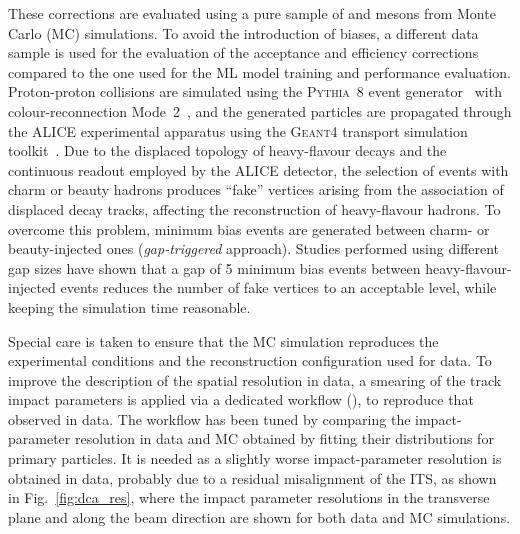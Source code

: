 These corrections are evaluated using a pure sample of \ds and \dpl mesons from Monte Carlo (MC) simulations. To avoid the introduction of biases, a different data sample is used for the evaluation of the acceptance and efficiency corrections compared to the one used for the ML model training and performance evaluation. Proton-proton collisions are simulated using the \textsc{Pythia~8} event generator~\cite{Bierlich:2022pfr} with colour-reconnection Mode~2~\cite{Christiansen:2015yqa}, and the generated particles are propagated through the ALICE experimental apparatus using the \textsc{Geant4} transport simulation toolkit~\cite{GEANT4:2002zbu}. Due to the displaced topology of heavy-flavour decays and the continuous readout employed by the ALICE detector, the selection of events with charm or beauty hadrons produces ``fake'' vertices arising from the association of displaced decay tracks, affecting the reconstruction of heavy-flavour hadrons. To overcome this problem, minimum bias events are generated between charm- or beauty-injected ones (\emph{gap-triggered} approach). Studies performed using different gap sizes have shown that a gap of 5 minimum bias events between heavy-flavour-injected events reduces the number of fake vertices to an acceptable level, while keeping the simulation time reasonable.

Special care is taken to ensure that the MC simulation reproduces the experimental conditions and the reconstruction configuration used for data. To improve the description of the spatial resolution in data, a smearing of the track impact parameters is applied via a dedicated workflow (), to reproduce that observed in data. The workflow has been tuned by comparing the impact-parameter resolution in data and MC obtained by fitting their distributions for primary particles. It is needed as a slightly worse impact-parameter resolution is obtained in data, probably due to a residual misalignment of the ITS, as shown in Fig.~\ref{fig:dca_res}, where the impact parameter resolutions in the transverse plane and along the beam direction are shown for both data and MC simulations.

